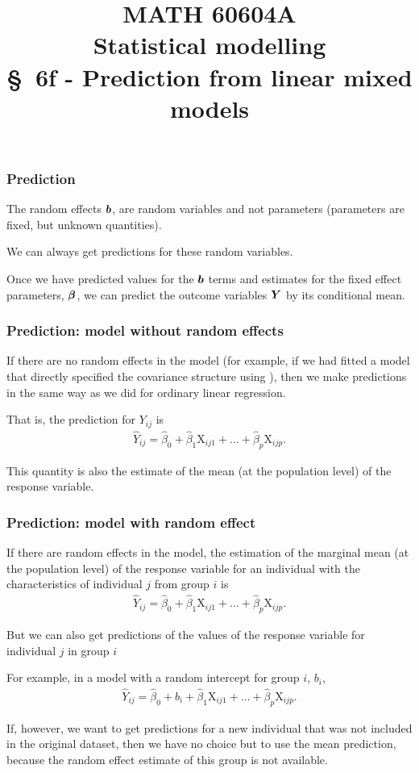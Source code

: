 \documentclass{beamer}
\title[\color{white}{MATH 60604A \S~6f - Prediction from linear mixed models}]{\texorpdfstring{MATH 60604A \\Statistical modelling \\ \S~6f - Prediction from linear mixed models}{MATH 60604A \\Statistical modelling \\ \S~6f - Prediction from linear mixed models}}
\author{}
\institute{HEC Montréal\\
Department of Decision Sciences}
\date{}
\begin{document}
\frame{\titlepage}
\begin{frame}
\frametitle{Prediction}
\bi
\item The random effects $\boldsymbol {b}$, are \alert{random variables} and not parameters (parameters are fixed,  but unknown quantities). 
\item We can always get \alert{predictions} for these random variables. 
\item Once we have predicted values for the $\boldsymbol {b}$ terms and estimates for the fixed effect parameters, $\boldsymbol {\beta}$, we can predict the outcome variables $\boldsymbol {Y}$ by its conditional mean. 
\ei
\end{frame}


\begin{frame}
\frametitle{Prediction: model \textbf{without} random effects}
\bi
\item \alert{If there are no random effects in the model} (for example, if we had fitted a model that directly specified the covariance structure using ), then we make predictions in the same way as we did for ordinary linear regression. 
\item That is, the prediction for $Y_{ij}$ is
\begin{align*}
\hat{Y}_{ij}=\hat{\beta}_0 + \hat{\beta}_1\mathrm{X}_{ij1} + \ldots + \hat{\beta}_p\mathrm{X}_{ijp}.
\end{align*}
\item This quantity is also the estimate of the \alert{mean} (at the \alert{population level}) of the response variable.
\ei
\end{frame}

\begin{frame}
\frametitle{Prediction: model \textbf{with} random effect}
\bi
\item If there are random effects in the model, the estimation of the \alert{marginal mean} (at the \alert{population level}) of the response variable for an individual with the characteristics of individual $j$ from group $i$ is
\begin{align*}
\hat{Y}_{ij}=\hat{\beta}_0 + \hat{\beta}_1\mathrm{X}_{ij1} + \ldots + \hat{\beta}_p\mathrm{X}_{ijp}.
\end{align*}


\item But we can also get predictions of the
values of the response variable for individual $j$ in group $i$
\item For example, in a model with a random intercept for group $i$, $b_{i}$,
 \begin{align*}
\hat{Y}_{ij}=\hat{\beta}_0 +\hat{b}_{i} + \hat{\beta}_1\mathrm{X}_{ij1} + \ldots + \hat{\beta}_p\mathrm{X}_{ijp}. 
\end{align*}

\item If, however, we want to get predictions for a \alert{new}
individual that was not included in the original dataset, then we have no choice but to use the mean prediction, because the random effect estimate of this group is not available.
\ei
\end{frame}
\end{document}
